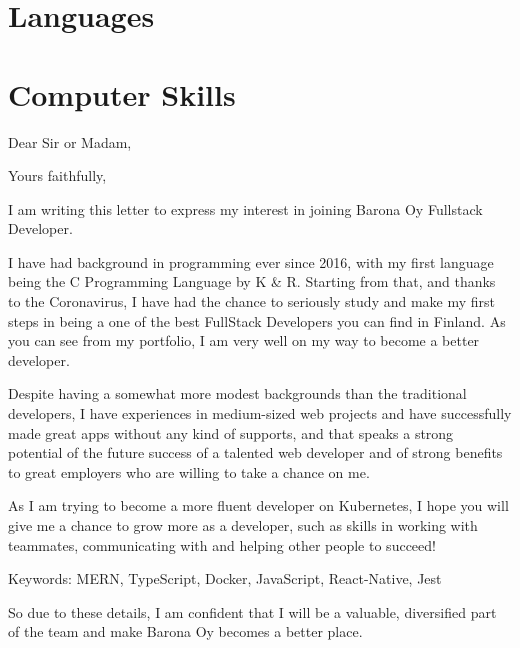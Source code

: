 \documentclass[11pt,a4paper,sans]{moderncv}
\begin{document}
  \clearpage

  \section{Languages}

  \section{Computer Skills}

  \clearpage

  \date{February 22, 2021}
  \opening{Dear Sir or Madam,}
  \closing{Yours faithfully,}
  \makelettertitle

  I am writing this letter to express my interest in joining
  Barona Oy Fullstack Developer.

  I have had background in programming ever since 2016, with my
  first language being the C Programming Language by K \& R. Starting
  from that, and thanks to the Coronavirus, I have had the chance
  to seriously study and make my first steps in being a
  one of the best FullStack Developers you can find in Finland.
  As you can see from my portfolio, I am very well on my way to become
  a better developer.

  Despite having a somewhat more modest backgrounds than the traditional developers,
  I have experiences
  in medium-sized web projects and have successfully made great apps without
  any kind of supports, and that speaks a strong potential of the future
  success of a talented web developer and of strong benefits to
  great employers who are willing to take a chance on me.

  As I am trying to become a more fluent developer on Kubernetes,
  I hope you will give me a chance to grow more as a developer,
  such as skills in working with teammates, communicating with and helping other
  people to succeed!

  Keywords: MERN, TypeScript, Docker, JavaScript, React-Native, Jest

  So due to these details, I am confident that I will be a valuable, diversified
  part of the team and make Barona Oy becomes a better place.

  \makeletterclosing
\end{document}
